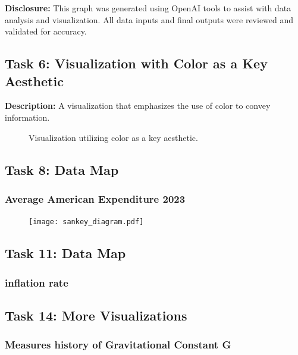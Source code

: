 \documentclass[a4paper,landscape]{article}
\begin{document}
\textbf{Disclosure:} This graph was generated using OpenAI tools to assist with data analysis and visualization. All data inputs and final outputs were reviewed and validated for accuracy.

\subsection{Task 6: Visualization with Color as a Key Aesthetic}
\textbf{Description:} A visualization that emphasizes the use of color to convey information.

\begin{figure}[H]
    \centering
    \caption{Visualization utilizing color as a key aesthetic.}
    \label{fig:color}
\end{figure}

\subsection{Task 8: Data Map}
\subsubsection{Average American Expenditure 2023}
\begin{figure}[H]
    \centering
    \texttt{[image: sankey\_diagram.pdf]} %
    \label{fig:americanExp}
\end{figure}

\subsection{Task 11: Data Map}
\subsubsection{inflation rate}

\begin{figure}[H]
    \centering
    \caption{}
    \label{fig:inflation}
\end{figure}

\subsection{Task 14: More Visualizations}
\subsubsection{Measures history of Gravitational Constant G}
\end{document}
